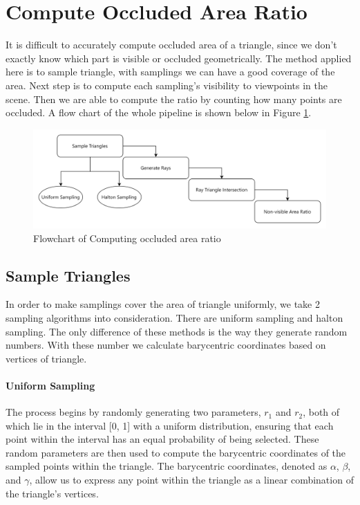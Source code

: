 \documentclass[11pt, a4paper,oneside,chapterprefix=false]{scrbook}
\begin{document}
\section{Compute Occluded Area Ratio} \label{sec:compute occluded area ratio}

It is difficult to accurately compute occluded area of a triangle, since we don't exactly know which part is visible or occluded geometrically. The method applied here is to sample triangle, with samplings we can have a good coverage of the area. Next step is to compute each sampling's visibility to viewpoints in the scene. Then we are able to compute the ratio by counting how many points are occluded. A flow chart of the whole pipeline is shown below in Figure \ref{fig:flowchart of computing occluded area ratio}.

\begin{figure}[H]
    \centering
    \includegraphics*[width=1.0\textwidth]{figures/Compute occluded Area Ratio.png}
    \caption{Flowchart of Computing occluded area ratio}
    \label{fig:flowchart of computing occluded area ratio}
\end{figure}

\subsection{Sample Triangles} \label{subsec:sample triangle}

In order to make samplings cover the area of triangle uniformly, we take 2 sampling algorithms into consideration. There are uniform sampling and halton sampling. The only difference of these methods is the way they generate random numbers. With these number we calculate barycentric coordinates based on vertices of triangle. 

\paragraph{Uniform Sampling}

The process begins by randomly generating two parameters, \( r_1 \) and \( r_2 \), both of which lie in the interval [0, 1] with a uniform distribution, ensuring that each point within the interval has an equal probability of being selected. These random parameters are then used to compute the barycentric coordinates of the sampled points within the triangle. The barycentric coordinates, denoted as \( \alpha \), \( \beta \), and \( \gamma \), allow us to express any point within the triangle as a linear combination of the triangle's vertices.
\end{document}
